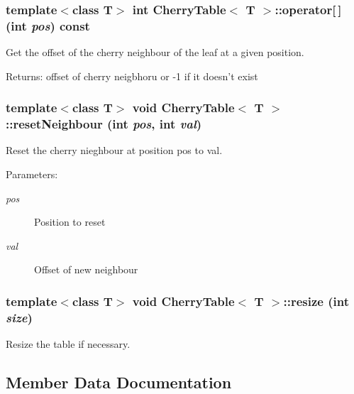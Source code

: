 \subsubsection{\setlength{\rightskip}{0pt plus 5cm}template$<$class T$>$ int {\bf Cherry\-Table}$<$ T $>$::operator[$\,$] (int {\em pos}) const\hspace{0.3cm}{\tt  [inline]}}\label{classCherryTable_a7}


Get the offset of the cherry neighbour of the leaf at a given position. 

\begin{Desc}
\item[Returns:]offset of cherry neigbhoru or -1 if it doesn't exist \end{Desc}
\subsubsection{\setlength{\rightskip}{0pt plus 5cm}template$<$class T$>$ void {\bf Cherry\-Table}$<$ T $>$::reset\-Neighbour (int {\em pos}, int {\em val})\hspace{0.3cm}{\tt  [inline]}}\label{classCherryTable_a6}


Reset the cherry nieghbour at position pos to val. 

\begin{Desc}
\item[Parameters:]
\begin{description}
\item[{\em pos}]Position to reset \item[{\em val}]Offset of new neighbour \end{description}
\end{Desc}
\subsubsection{\setlength{\rightskip}{0pt plus 5cm}template$<$class T$>$ void {\bf Cherry\-Table}$<$ T $>$::resize (int {\em size})}\label{classCherryTable_a3}


Resize the table if necessary. 



\subsection{Member Data Documentation}
